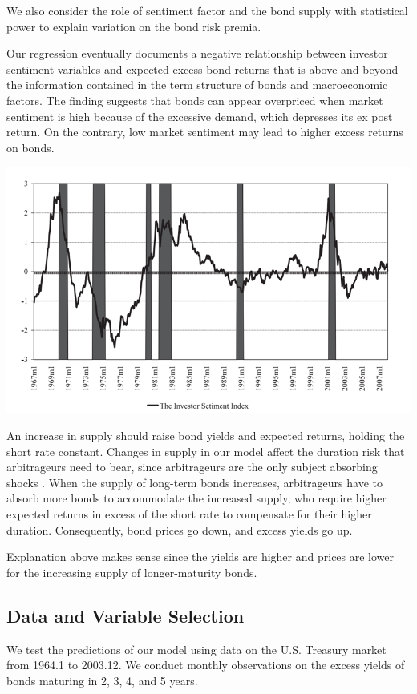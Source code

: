 \documentclass[12pt]{article}
\begin{document}
We also consider the role of sentiment factor and the bond supply with statistical power to explain variation on the bond risk premia.

Our regression eventually documents a negative relationship between investor sentiment variables and expected excess bond returns that is above and beyond the information contained in the term structure of bonds and macroeconomic factors. The finding suggests that bonds can appear overpriced when market sentiment is high because of the excessive demand, which depresses its ex post return. On the contrary, low market sentiment may lead to higher excess returns on bonds.

\centerline{\includegraphics[scale=0.47]{Figure1.png}}

An increase in supply should raise bond yields and expected returns, holding the short rate constant. Changes in supply in our model affect the duration risk that arbitrageurs need to bear, since arbitrageurs are the only subject absorbing shocks . When the supply of long-term bonds increases, arbitrageurs have to absorb more bonds to accommodate the increased supply, who require higher expected returns in excess of the short rate to compensate for their higher duration. Consequently, bond prices go down, and excess yields go up. 

Explanation above makes sense since the yields are higher and prices are lower for the increasing supply of longer-maturity bonds.

\subsection{Data and Variable Selection}
We test the predictions of our model using data on the U.S. Treasury market from 1964.1 to 2003.12. We conduct monthly observations on the excess yields of bonds maturing in 2, 3, 4, and 5 years.
\end{document}
